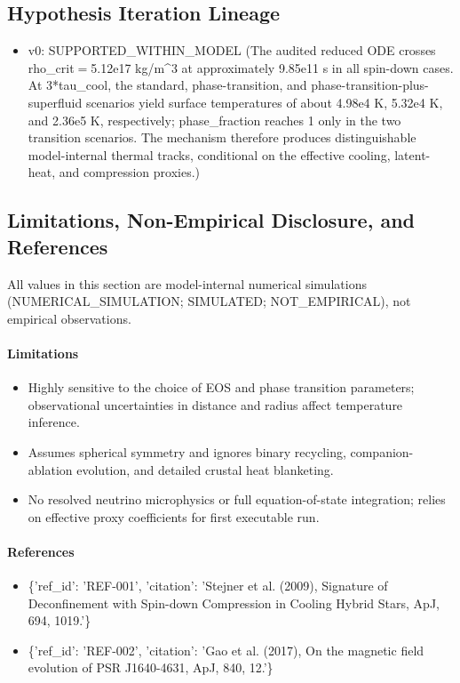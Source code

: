 \documentclass[11pt]{article}
\begin{document}
\subsection{Hypothesis Iteration Lineage}

\begin{itemize}
\item v0: SUPPORTED\_WITHIN\_MODEL (The audited reduced ODE crosses rho\_crit\ensuremath{=}5.12e17 kg/m\textasciicircum{}3 at approximately 9.85e11 s in all spin-down cases. At 3*tau\_cool, the standard, phase-transition, and phase-transition-plus-superfluid scenarios yield surface temperatures of about 4.98e4 K, 5.32e4 K, and 2.36e5 K, respectively; phase\_fraction reaches 1 only in the two transition scenarios. The mechanism therefore produces distinguishable model-internal thermal tracks, conditional on the effective cooling, latent-heat, and compression proxies.)
\end{itemize}

\subsection{Limitations, Non-Empirical Disclosure, and References}

\noindent All values in this section are model-internal numerical simulations (NUMERICAL\_SIMULATION; SIMULATED; NOT\_EMPIRICAL), not empirical observations.

\paragraph{Limitations}
\begin{itemize}
\item Highly sensitive to the choice of EOS and phase transition parameters; observational uncertainties in distance and radius affect temperature inference.
\item Assumes spherical symmetry and ignores binary recycling, companion-ablation evolution, and detailed crustal heat blanketing.
\item No resolved neutrino microphysics or full equation-of-state integration; relies on effective proxy coefficients for first executable run.
\end{itemize}

\paragraph{References}
\begin{itemize}
\item \{'ref\_id': 'REF-001', 'citation': 'Stejner et al. (2009), Signature of Deconfinement with Spin-down Compression in Cooling Hybrid Stars, ApJ, 694, 1019.'\}
\item \{'ref\_id': 'REF-002', 'citation': 'Gao et al. (2017), On the magnetic field evolution of PSR J1640-4631, ApJ, 840, 12.'\}
\end{itemize}
\end{document}
